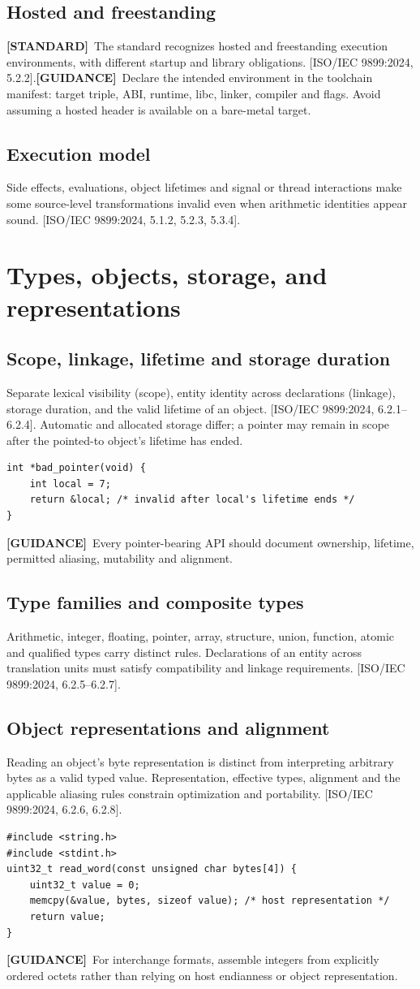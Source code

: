 \documentclass[10pt,letterpaper,oneside]{report}
\newcommand{\refcl}[1]{\textsf{\footnotesize[ISO/IEC 9899:2024, #1]}}
\newcommand{\standard}{\textbf{[STANDARD]}}
\newcommand{\guidance}{\textbf{[GUIDANCE]}}
\begin{document}
\section{Hosted and freestanding}
\standard\ The standard recognizes hosted and freestanding execution environments, with different startup and library obligations. \refcl{5.2.2}.\guidance\ Declare the intended environment in the toolchain manifest: target triple, ABI, runtime, libc, linker, compiler and flags. Avoid assuming a hosted header is available on a bare-metal target.
\section{Execution model}
Side effects, evaluations, object lifetimes and signal or thread interactions make some source-level transformations invalid even when arithmetic identities appear sound. \refcl{5.1.2, 5.2.3, 5.3.4}.
\chapter{Types, objects, storage, and representations}
\section{Scope, linkage, lifetime and storage duration}
Separate lexical visibility (scope), entity identity across declarations (linkage), storage duration, and the valid lifetime of an object. \refcl{6.2.1--6.2.4}. Automatic and allocated storage differ; a pointer may remain in scope after the pointed-to object's lifetime has ended.
\begin{lstlisting}
int *bad_pointer(void) {
    int local = 7;
    return &local; /* invalid after local's lifetime ends */
}
\end{lstlisting}
\guidance\ Every pointer-bearing API should document ownership, lifetime, permitted aliasing, mutability and alignment.
\section{Type families and composite types}
Arithmetic, integer, floating, pointer, array, structure, union, function, atomic and qualified types carry distinct rules. Declarations of an entity across translation units must satisfy compatibility and linkage requirements. \refcl{6.2.5--6.2.7}.
\section{Object representations and alignment}
Reading an object's byte representation is distinct from interpreting arbitrary bytes as a valid typed value. Representation, effective types, alignment and the applicable aliasing rules constrain optimization and portability. \refcl{6.2.6, 6.2.8}.
\begin{lstlisting}
#include <string.h>
#include <stdint.h>
uint32_t read_word(const unsigned char bytes[4]) {
    uint32_t value = 0;
    memcpy(&value, bytes, sizeof value); /* host representation */
    return value;
}
\end{lstlisting}
\guidance\ For interchange formats, assemble integers from explicitly ordered octets rather than relying on host endianness or object representation.
\end{document}
